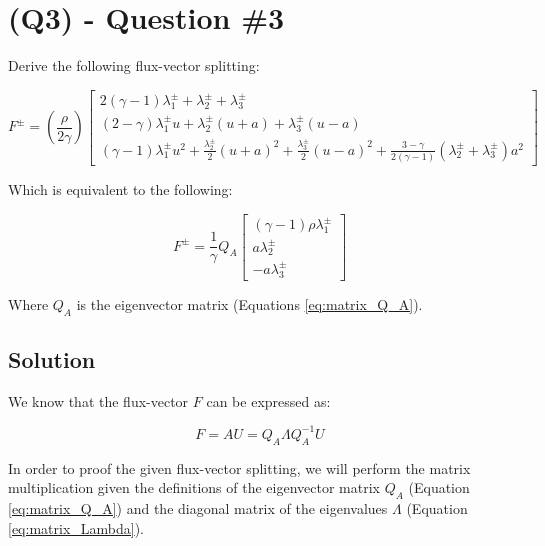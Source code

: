 \section{(Q3) - Question \#3}
\label{sec:Q3}

Derive the following flux-vector splitting:

\begin{equation}
    F^\pm = \left( \frac{\rho}{2\gamma} \right) \begin{bmatrix}
        2(\gamma - 1) \lambda_1^\pm + \lambda_2^\pm + \lambda_3^\pm                  \\
        (2 - \gamma) \lambda_1^\pm u + \lambda_2^\pm (u + a) + \lambda_3^\pm (u - a) \\
        (\gamma - 1) \lambda_1^\pm u^2 + \frac{\lambda_2^\pm}{2} (u + a)^2 + \frac{\lambda_3^\pm}{2} (u - a)^2 + \frac{3-\gamma}{2(\gamma - 1)} (\lambda_2^\pm + \lambda_3^\pm) a^2
    \end{bmatrix}
    \label{eq:flux_vector_splitting}
\end{equation}

Which is equivalent to the following:

\begin{equation}
    F^\pm = \frac{1}{\gamma} Q_A \begin{bmatrix}
        (\gamma - 1) \rho \lambda_1^\pm \\
        a \lambda_2^\pm                 \\
        -a \lambda_3^\pm
    \end{bmatrix}
\end{equation}

Where $Q_A$ is the eigenvector matrix (Equations \ref{eq:matrix_Q_A}).

\subsection{Solution}

We know that the flux-vector $F$ can be expressed as:

\begin{equation}
    F = A U = Q_A \Lambda Q_A^{-1} U
\end{equation}

In order to proof the given flux-vector splitting, we will perform the matrix multiplication given the definitions of the eigenvector matrix $Q_A$ (Equation \ref{eq:matrix_Q_A}) and the diagonal matrix of the eigenvalues $\Lambda$ (Equation \ref{eq:matrix_Lambda}).

